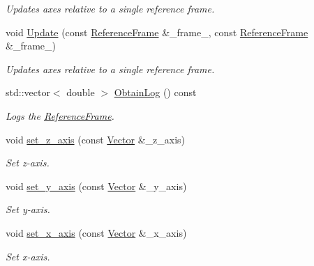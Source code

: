 \begin{DoxyCompactItemize}
\begin{DoxyCompactList}\small\item\em Updates axes relative to a single reference frame. \end{DoxyCompactList}\item 
void \hyperlink{classosse_1_1collaborate_1_1_reference_frame_aa32123d1bb0af3ba1f3bb68d72c8e6e3}{Update} (const \hyperlink{classosse_1_1collaborate_1_1_reference_frame}{Reference\+Frame} \&\+\_\+frame\+\_, const \hyperlink{classosse_1_1collaborate_1_1_reference_frame}{Reference\+Frame} \&\+\_\+frame\+\_)
\begin{DoxyCompactList}\small\item\em Updates axes relative to a single reference frame. \end{DoxyCompactList}\item 
std\+::vector$<$ double $>$ \hyperlink{classosse_1_1collaborate_1_1_reference_frame_ac448c98f8206e372f7c367b511f008e6}{Obtain\+Log} () const
\begin{DoxyCompactList}\small\item\em Logs the \hyperlink{classosse_1_1collaborate_1_1_reference_frame}{Reference\+Frame}. \end{DoxyCompactList}\item 
void \hyperlink{classosse_1_1collaborate_1_1_reference_frame_adf108795332e39e7975d7bfe69774b78}{set\+\_\+z\+\_\+axis} (const \hyperlink{classosse_1_1collaborate_1_1_vector}{Vector} \&\+\_\+z\+\_\+axis)
\begin{DoxyCompactList}\small\item\em Set z-\/axis. \end{DoxyCompactList}\item 
void \hyperlink{classosse_1_1collaborate_1_1_reference_frame_a239519dbae2c753b8763d5b39d97e93d}{set\+\_\+y\+\_\+axis} (const \hyperlink{classosse_1_1collaborate_1_1_vector}{Vector} \&\+\_\+y\+\_\+axis)
\begin{DoxyCompactList}\small\item\em Set y-\/axis. \end{DoxyCompactList}\item 
void \hyperlink{classosse_1_1collaborate_1_1_reference_frame_a58806d59231dd107bf2b25a0a7396266}{set\+\_\+x\+\_\+axis} (const \hyperlink{classosse_1_1collaborate_1_1_vector}{Vector} \&\+\_\+x\+\_\+axis)
\begin{DoxyCompactList}\small\item\em Set x-\/axis. \end{DoxyCompactList}\item 

\end{DoxyCompactItemize}
